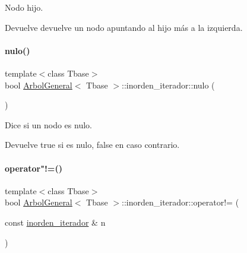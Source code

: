 Nodo hijo. 

\begin{DoxyReturn}{Devuelve}
devuelve un nodo apuntando al hijo más a la izquierda. 
\end{DoxyReturn}
\hypertarget{classArbolGeneral_1_1inorden__iterador_ab4f05a51c5ddba4ca127f2440a3e3963}{}\label{classArbolGeneral_1_1inorden__iterador_ab4f05a51c5ddba4ca127f2440a3e3963} 
\paragraph{\texorpdfstring{nulo()}{nulo()}}
{\footnotesize\ttfamily template$<$class Tbase$>$ \\
bool \hyperlink{classArbolGeneral}{Arbol\+General}$<$ Tbase $>$\+::inorden\+\_\+iterador\+::nulo (\begin{DoxyParamCaption}{ }\end{DoxyParamCaption})\hspace{0.3cm}{\ttfamily [inline]}}



Dice si un nodo es nulo. 

\begin{DoxyReturn}{Devuelve}
true si es nulo, false en caso contrario. 
\end{DoxyReturn}
\hypertarget{classArbolGeneral_1_1inorden__iterador_a00c8e1e90772d16dc0c0e59c45f44fb6}{}\label{classArbolGeneral_1_1inorden__iterador_a00c8e1e90772d16dc0c0e59c45f44fb6} 
\paragraph{\texorpdfstring{operator"!=()}{operator!=()}}
{\footnotesize\ttfamily template$<$class Tbase$>$ \\
bool \hyperlink{classArbolGeneral}{Arbol\+General}$<$ Tbase $>$\+::inorden\+\_\+iterador\+::operator!= (\begin{DoxyParamCaption}\item[{const \hyperlink{classArbolGeneral_1_1inorden__iterador}{inorden\+\_\+iterador} \&}]{n }\end{DoxyParamCaption})\hspace{0.3cm}{\ttfamily [inline]}}



